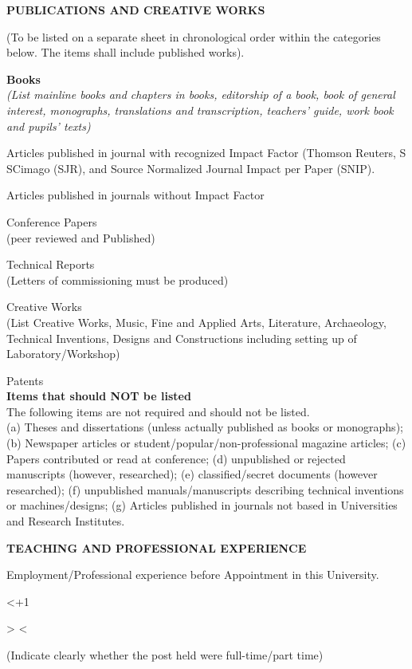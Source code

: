 \documentclass[12pt]{article}
\makeatletter
\newcommand{\markpos}[1]{\leavevmode\zsavepos{#1}}
\newcommand{\field}[2]{\markpos{f:#1:s}\rule{#2}{0.4pt}\markpos{f:#1:e}}
\newcommand{\sect}[2]{\par\noindent\makebox[2.2em][l]{\textbf{#1}}\textbf{#2}\par}
\def\br@cells#1{%
  \ifnum\br@col>\br@cols\else
    \ifnum\br@cols=2 \def\br@w{\dimexpr(\linewidth-3.7em)/2\relax}\else\def\br@w{\dimexpr(\linewidth-5.2em)/3\relax}\fi
    \edef\br@id{#1.r\the\br@row.c\the\br@col}%
    \expandafter\field\expandafter{\br@id}{\br@w}%
    \ifnum\br@col<\br@cols\hspace{1.5em}\fi
    \advance\br@col 1
    \expandafter\br@cells\expandafter{#1}%
  \fi}
\newcommand{\blankrows}[3]{%
  \br@cols=#2\relax
  \br@row=1
  \loop\ifnum\br@row<\numexpr#3+1\relax
    \par\noindent\hspace*{2.2em}%
    \br@col=1 \br@cells{#1}%
    \par\vspace{0.2em}%
    \advance\br@row 1
  \repeat}
\newcommand{\colheadsii}[2]{\par\noindent\hspace*{2.2em}\makebox[\dimexpr(\linewidth-3.7em)/2][l]{\hspace{1em}#1}\hspace{1.5em}\makebox[\dimexpr(\linewidth-3.7em)/2][l]{\hspace{1em}#2}\par}
\newcommand{\sectionend}[1]{\zsavepos{s:#1}}
\newcommand{\itemlist}{\begin{description}[leftmargin=2.2em,labelwidth=2.2em,labelsep=0pt,font=\normalfont]}
\makeatother
\begin{document}
\sect{B2}{PUBLICATIONS AND CREATIVE WORKS}
(To be listed on a separate sheet in chronological order within the categories below. The items shall include published works).
\begin{description}[leftmargin=2.2em,labelwidth=2.2em,labelsep=0pt,font=\bfseries]
\item[(a)] \textbf{Books}\\
\textit{(List mainline books and chapters in books, editorship of a book, book of general interest, monographs, translations and transcription, teachers' guide, work book and pupils' texts)}
\item[(b)] Articles published in journal with recognized Impact Factor (Thomson Reuters, S SCimago (SJR), and Source Normalized Journal Impact per Paper (SNIP).
\item[(c)] Articles published in journals without Impact Factor
\item[(d)] Conference Papers\\
(peer reviewed and Published)
\item[(d)] Technical Reports\\
(Letters of commissioning must be produced)
\item[(e)] Creative Works\\
(List Creative Works, Music, Fine and Applied Arts, Literature, Archaeology, Technical Inventions, Designs and Constructions including setting up of Laboratory/Workshop)
\item[(g)] Patents\\
\textbf{Items that should NOT be listed}\\
The following items are not required and should not be listed.\\
(a) Theses and dissertations (unless actually published as books or monographs); (b) Newspaper articles or student/popular/non-professional magazine articles; (c) Papers contributed or read at conference; (d) unpublished or rejected manuscripts (however, researched); (e) classified/secret documents (however researched); (f) unpublished manuals/manuscripts describing technical inventions or machines/designs; (g) Articles published in journals not based in Universities and Research Institutes.
\end{description}
\sectionend{B2}

\sect{B3}{TEACHING AND PROFESSIONAL EXPERIENCE}
\itemlist
\item[(a)] Employment/Professional experience before Appointment in this University.
\end{description}
\colheadsii{Post}{Date}
\blankrows{B3a}{2}{4}
\begin{center}(Indicate clearly whether the post held were full-time/part time)\end{center}
\end{document}
